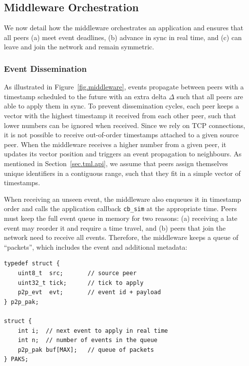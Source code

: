 \documentclass[fleqn,10pt]{SelfArx}
\newcommand{\code}[1]  {\texttt{\footnotesize{#1}}}
\begin{document}
\subsection{Middleware Orchestration}
\label{sec.tml.middleware}

We now detail how the middleware orchestrates an application and ensures that
all peers
    (a) meet event deadlines,
    (b) advance in sync in real time, and
    (c) can leave and join the network and remain symmetric.

\subsubsection{Event Dissemination}
\label{sec.tml.middleware.events}

As illustrated in Figure~\ref{fig.middleware}, events propagate between peers
with a timestamp scheduled to the future with an extra delta $\Delta$ such that
all peers are able to apply them in sync.
%
To prevent dissemination cycles, each peer keeps a vector with the highest
timestamp it received from each other peer, such that lower numbers can be
ignored when received.
Since we rely on TCP connections, it is not possible to receive out-of-order
timestamps attached to a given source peer.
When the middleware receives a higher number from a given peer, it updates its
vector position and triggers an event propagation to neighbours.
%
As mentioned in Section~\ref{sec.tml.api}, we assume that peers assign
themselves unique identifiers in a contiguous range, such that they fit in a
simple vector of timestamps.

When receiving an unseen event, the middleware also enqueues it in timestamp
order and calls the application callback \code{cb\_sim} at the appropriate
time.
Peers must keep the full event queue in memory for two reasons:
    (a) receiving a late event may reorder it and require a time travel, and
    (b) peers that join the network need to receive all events.
%
Therefore, the middleware keeps a queue of ``packets'', which includes the
event and additional metadata:

{\footnotesize
\begin{verbatim}
typedef struct {
    uint8_t  src;       // source peer
    uint32_t tick;      // tick to apply
    p2p_evt  evt;       // event id + payload
} p2p_pak;

struct {
    int i;  // next event to apply in real time
    int n;  // number of events in the queue
    p2p_pak buf[MAX];   // queue of packets
} PAKS;
\end{verbatim}
}
\end{document}
